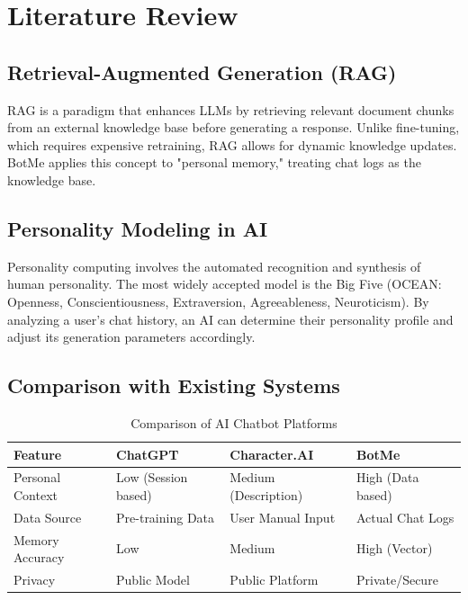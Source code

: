 \documentclass[12pt,a4paper]{report}
\begin{document}
\chapter{Literature Review}

\section{Retrieval-Augmented Generation (RAG)}
RAG is a paradigm that enhances LLMs by retrieving relevant document chunks from an external knowledge base before generating a response. Unlike fine-tuning, which requires expensive retraining, RAG allows for dynamic knowledge updates. BotMe applies this concept to "personal memory," treating chat logs as the knowledge base.

\section{Personality Modeling in AI}
Personality computing involves the automated recognition and synthesis of human personality. The most widely accepted model is the Big Five (OCEAN: Openness, Conscientiousness, Extraversion, Agreeableness, Neuroticism). By analyzing a user's chat history, an AI can determine their personality profile and adjust its generation parameters accordingly.

\section{Comparison with Existing Systems}
\begin{table}[H]
\centering
\caption{Comparison of AI Chatbot Platforms}
\vspace{0.5em}
\begin{tabular}{@{}llll@{}}
\toprule
\textbf{Feature} & \textbf{ChatGPT} & \textbf{Character.AI} & \textbf{BotMe} \\ \midrule
Personal Context & Low (Session based) & Medium (Description) & High (Data based) \\
Data Source & Pre-training Data & User Manual Input & Actual Chat Logs \\
Memory Accuracy & Low & Medium & High (Vector) \\
Privacy & Public Model & Public Platform & Private/Secure \\ \bottomrule
\end{tabular}
\label{tab:comparison}
\end{table}
\end{document}
